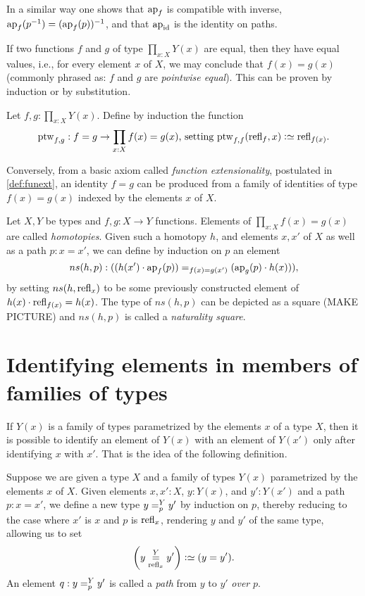 In a similar way one shows that $\ap f$ is compatible with inverse,
$\ap f(p^{-1}) =  (\ap f (p))^{-1}$, and that $\ap \id$ is the identity on paths. 

If two functions $f$ and $g$ of type $\prod_{x:X} Y(x)$ are equal, 
then they have equal values, i.e., for every element $x$ of $X$, 
we may conclude that $f(x) = g(x)$ (commonly phrased as:
$f$ and $g$ are \emph{pointwise equal}).
This can be proven by induction or by substitution.

\begin{definition}\label{def:ptw}
Let $f,g:\prod_{x:X} Y(x)$. Define by induction the function
\[ 
{\ptw}_{f,g}: f=g \to \prod_{x:X} f(x)=g(x) 
\text{,~setting ${\ptw}_{f,f}(\refl{f},x)\defeq\refl{f(x)}$.}
\] 
\end{definition}

Conversely, from a basic axiom called \emph{function extensionality}, 
postulated in \cref{def:funext}, an identity $f=g$ can be produced from a 
family of identities of type $f(x) = g(x)$ indexed by the elements $x$ of $X$.

\begin{definition}\label{def:natural-homotopy}
Let $X,Y$ be types and $f,g: X\to Y$ functions.
Elements of $\prod_{x:X} f(x)=g(x)$ are called \emph{homotopies}.
Given such a homotopy $h$, and elements $x,x'$ of $X$ as well as a path $p: x=x'$,
we can define by induction on $p$ an element
\[ 
ns(h,p): ((h(x')\cdot \ap{f}(p)) =_{f(x)=g(x')} (\ap{g}(p)\cdot h(x))),
\]
by setting $ns(h,\refl{x})$ to be some previously
constructed element of $h(x) \cdot \refl{f(x)} = h(x)$.
The type of $ns(h,p)$ can be depicted as a square (MAKE PICTURE)
and $ns(h,p)$ is called a \emph{naturality square}.%
\end{definition}

\section{Identifying elements in members of families of types}

If $Y(x)$ is a family of types parametrized by the elements $x$ of a type $X$, then it is possible to identify an element of $Y(x)$ with an
element of $Y(x')$ only after identifying $x$ with $x'$.  That is the idea of the following definition.

\begin{definition}\label{def:pathsoverpaths}
  Suppose we are given a type $X$ and a family of types $Y(x)$ parametrized by the elements $x$ of $X$.  Given elements $x,x':X$, $y:Y(x)$, and
  $y':Y(x')$ and a path $p : x = x'$, we define a new type $y =^{Y}_{p} y'$ by induction on $p$, thereby reducing to the case
  where $x'$ is $x$ and $p$ is $\refl x$,
  rendering $y$ and $y'$ of the same type,
  allowing us to set $$\left( \pathoverdisplay y Y {\refl x} {y'} \right) \defeq (y = y').$$
An element $q : y =^{Y}_{p} y'$ is called a {\em path} from $y$ to $y'$ {\em over} $p$.
\end{definition}

